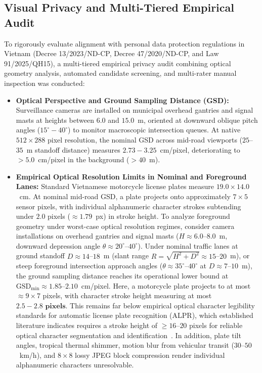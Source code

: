 \documentclass[preprint,12pt]{elsarticle}
\begin{document}
\subsection{Visual Privacy and Multi-Tiered Empirical Audit}
To rigorously evaluate alignment with personal data protection regulations in Vietnam (Decree 13/2023/ND-CP, Decree 47/2020/ND-CP, and Law 91/2025/QH15), a multi-tiered empirical privacy audit combining optical geometry analysis, automated candidate screening, and multi-rater manual inspection was conducted:
\begin{itemize}
    \item \textbf{Optical Perspective and Ground Sampling Distance (GSD):} Surveillance cameras are installed on municipal overhead gantries and signal masts at heights between $\mathbf{6.0}$ and $\mathbf{15.0}$~m, oriented at downward oblique pitch angles ($15^\circ - 40^\circ$) to monitor macroscopic intersection queues. At native $512 \times 288$ pixel resolution, the nominal GSD across mid-road viewports ($25$--$35$~m standoff distance) measures $\mathbf{2.73 - 3.25}$~cm/pixel, deteriorating to $>5.0$~cm/pixel in the background ($>40$~m).
    \item \textbf{Empirical Optical Resolution Limits in Nominal and Foreground Lanes:} Standard Vietnamese motorcycle license plates measure $19.0 \times 14.0$~cm. At nominal mid-road GSD, a plate projects onto approximately $7 \times 5$ sensor pixels, with individual alphanumeric character strokes subtending under $2.0$ pixels ($\approx 1.79$~px) in stroke height. To analyze foreground geometry under worst-case optical resolution regimes, consider camera installations on overhead gantries and signal masts ($H \approx 6.0$--$8.0$~m, downward depression angle $\theta \approx 20^\circ$--$40^\circ$). Under nominal traffic lanes at ground standoff $D \approx 14$--$18$~m (slant range $R = \sqrt{H^2 + D^2} \approx 15$--$20$~m), or steep foreground intersection approach angles ($\theta \approx 35^\circ$--$40^\circ$ at $D \approx 7$--$10$~m), the ground sampling distance reaches its operational lower bound at $\text{GSD}_{\min} \approx 1.85$--$2.10$~cm/pixel. Here, a motorcycle plate projects to at most $\approx 9 \times 7$ pixels, with character stroke height measuring at most $\mathbf{2.5 - 2.8\text{ pixels}}$. This remains far below empirical optical character legibility standards for automatic license plate recognition (ALPR), which established literature indicates requires a stroke height of $\ge 16$--$20$ pixels for reliable optical character segmentation and identification~\cite{du2013automatic}. In addition, plate tilt angles, tropical thermal shimmer, motion blur from vehicular transit ($30$--$50$~km/h), and $8 \times 8$ lossy JPEG block compression render individual alphanumeric characters unresolvable.

\end{itemize}
\end{document}
